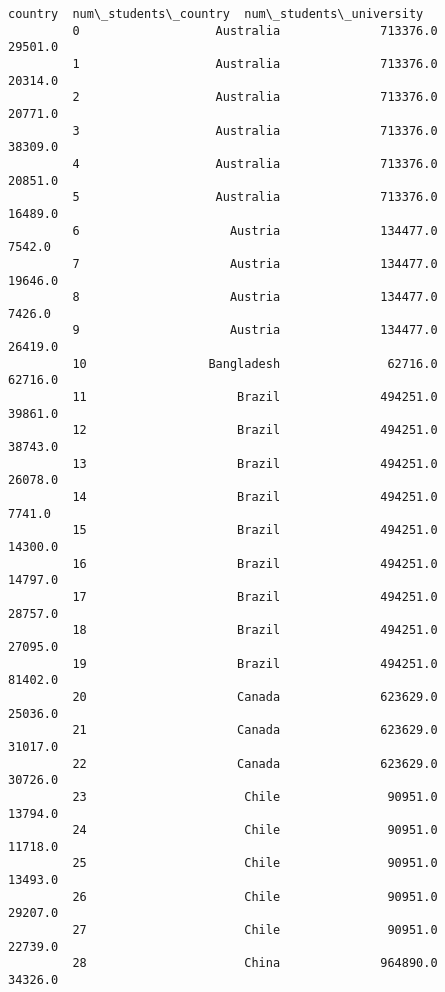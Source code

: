 \documentclass[11pt]{article}
\begin{document}
\begin{Verbatim}[commandchars=\\\{\}]
                               country  num\_students\_country  num\_students\_university  
         0                   Australia              713376.0                  29501.0  
         1                   Australia              713376.0                  20314.0  
         2                   Australia              713376.0                  20771.0  
         3                   Australia              713376.0                  38309.0  
         4                   Australia              713376.0                  20851.0  
         5                   Australia              713376.0                  16489.0  
         6                     Austria              134477.0                   7542.0  
         7                     Austria              134477.0                  19646.0  
         8                     Austria              134477.0                   7426.0  
         9                     Austria              134477.0                  26419.0  
         10                 Bangladesh               62716.0                  62716.0  
         11                     Brazil              494251.0                  39861.0  
         12                     Brazil              494251.0                  38743.0  
         13                     Brazil              494251.0                  26078.0  
         14                     Brazil              494251.0                   7741.0  
         15                     Brazil              494251.0                  14300.0  
         16                     Brazil              494251.0                  14797.0  
         17                     Brazil              494251.0                  28757.0  
         18                     Brazil              494251.0                  27095.0  
         19                     Brazil              494251.0                  81402.0  
         20                     Canada              623629.0                  25036.0  
         21                     Canada              623629.0                  31017.0  
         22                     Canada              623629.0                  30726.0  
         23                      Chile               90951.0                  13794.0  
         24                      Chile               90951.0                  11718.0  
         25                      Chile               90951.0                  13493.0  
         26                      Chile               90951.0                  29207.0  
         27                      Chile               90951.0                  22739.0  
         28                      China              964890.0                  34326.0  

\end{Verbatim}
\end{document}
